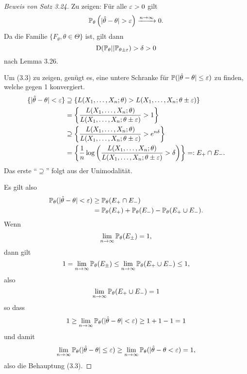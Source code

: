 \begin{proof}[Beweis von Satz 3.24]
  Zu zeigen: Für alle $\varepsilon > 0$ gilt
  \begin{equation}
    \mathbb{P}_\theta \left( | \hat{\theta} - \theta | > \varepsilon \right)
    \xrightarrow{n \to \infty} 0.
  \end{equation}
  Da die Familie $\{ F_\theta, \theta \in \Theta \}$ ist, gilt dann
  \[ \operatorname*{D}( \mathbb{P}_\theta || \mathbb{P}_{\theta \pm \varepsilon} ) > \delta > 0 \]
  nach Lemma 3.26.

  Um (3.3) zu zeigen, genügt es, eine untere Schranke für $\mathbb{P}(|\hat{\theta} -
  \theta| \le \varepsilon)$ zu finden, welche gegen 1 konvergiert.
  \[ \begin{aligned}
      \{ |\hat{\theta} - \theta| < \varepsilon \}
      &\supseteq \left\{
        L(X_1, \ldots, X_n; \theta) > L(X_1, \ldots, X_n; \theta \pm \varepsilon)
      \right\} \\
      &= \left\{
        \frac{L(X_1, \ldots, X_n; \theta)}{L(X_1, \ldots, X_n; \theta \pm \varepsilon)}
        > 1
      \right\} \\
      &\supseteq \left\{
        \frac{L(X_1, \ldots, X_n; \theta)}{L(X_1, \ldots, X_n; \theta \pm \varepsilon)}
        > e^{n \delta}
      \right\} \\
      &= \left\{
        \frac{1}{n} \log \left( 
          \frac{L(X_1, \ldots, X_n; \theta)}{L(X_1, \ldots, X_n; \theta \pm \varepsilon)}
          > \delta
         \right)
      \right\} =: E_+ \cap E_-.
    \end{aligned}
  \]
  Das erste ``$\supseteq$'' folgt aus der Unimodalität.

  Es gilt also
  \[ \begin{aligned}
      \mathbb{P}_\theta( |\hat{\theta} - \theta| < \varepsilon )
      &\ge \mathbb{P}_\theta( E_+ \cap E_- ) \\
      &= \mathbb{P}_\theta( E_+ ) + \mathbb{P}_\theta( E_- ) - \mathbb{P}_\theta( E_+ \cup E_- ).
    \end{aligned}
  \]
  Wenn
  \begin{equation}
    \lim_{n \to \infty} \mathbb{P}_\theta( E_\pm ) = 1,
  \end{equation}
  dann gilt
  \[ 1 = \lim_{n \to \infty} \mathbb{P}_\theta( E_\pm ) \le
    \lim_{n \to \infty} \mathbb{P}_\theta( E_+ \cup E_- ) \le 1, \]
  also
  \[ \lim_{n \to \infty} \mathbb{P}_\theta( E_+ \cup E_-) = 1 \]
  so dass
  \[ 1 \ge \lim_{n \to \infty} \mathbb{P}_\theta( |\hat{\theta} - \theta| < \varepsilon ) \ge
    1 + 1 - 1 = 1 \]
  und damit
  \[ \lim_{n \to \infty} \mathbb{P}_\theta( |\hat{\theta} - \theta| \le \varepsilon) \ge
    \lim_{n \to \infty} \mathbb{P}_\theta( |\hat{\theta} - \theta < \varepsilon ) = 1, \]
  also die Behauptung (3.3).


\end{proof}
